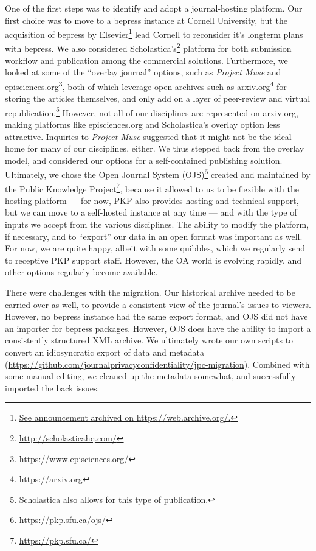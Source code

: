 \documentclass{jpcfinal} %
\newcommand{\urlcite}[2]{#2\footnote{\url{#1}}}
\newcommand{\urlcitex}[3]{#2\footnote{\href{#1}{#3}}}
\begin{document}
One of the first steps was to identify and adopt a journal-hosting platform. Our first choice was to move to a bepress instance at Cornell University, but the \urlcitex{https://web.archive.org/web/20181220151809/https://www.elsevier.com/about/press-releases/corporate/elsevier-acquires-bepress,-a-leading-service-provider-used-by-academic-institutions-to-showcase-their-research}{acquisition of bepress by Elsevier}{See announcement archived on  https://web.archive.org/.} lead Cornell to reconsider it's longterm plans with bepress. We also considered  \urlcite{http://scholasticahq.com/}{Scholastica's}  platform for both submission workflow and publication among the commercial solutions. Furthermore, we looked at some of the ``overlay journal'' options, such as \textit{Project Muse} and \urlcite{https://www.episciences.org/}{episciences.org}, both of which leverage open archives such as \urlcite{https://arxiv.org}{arxiv.org} for storing the articles themselves, and only add on a layer of peer-review and virtual republication.\footnote{Scholastica also allows for this type of publication.} 
%
However, not all of our disciplines are represented on arxiv.org, making platforms like episciences.org and Scholastica's overlay option less attractive. Inquiries to \textit{Project Muse} suggested that it might not be the ideal home for many of our disciplines, either. We thus stepped back from the overlay model, and considered our options for a self-contained publishing solution. Ultimately, we chose the \urlcite{https://pkp.sfu.ca/ojs/}{Open Journal System (OJS)}  created and maintained by the \urlcite{https://pkp.sfu.ca/}{Public Knowledge Project}, because it allowed to us to be flexible with the hosting platform --- for now, PKP also provides hosting and technical support, but we can move to a self-hosted instance at any time --- and with the type of inputs we accept from the various disciplines. The ability to modify the platform, if necessary, and to ``export'' our data in an open format was important as well. For now, we are quite happy, albeit with some quibbles, which we regularly send to receptive PKP support staff. However, the OA world is evolving rapidly, and other options regularly become available.  

There were challenges with the migration. Our historical archive needed to be carried over as well, to provide a consistent view of the journal's issues to viewers. However, no bepress instance had the same export format, and OJS did not have an importer for bepress packages. However, OJS does have the ability to import a consistently structured XML archive. We ultimately wrote our own scripts to convert an idiosyncratic export of data and metadata (\url{https://github.com/journalprivacyconfidentiality/jpc-migration}). Combined with some manual editing, we cleaned up the metadata somewhat, and successfully imported the back issues.
\end{document}
